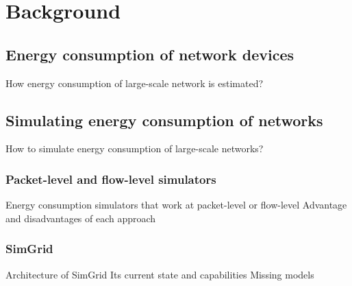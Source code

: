 \chapter{Background}
\label{chapter:background} 

\section{Energy consumption of network devices}
How energy consumption of large-scale network is estimated?
\section{Simulating energy consumption of networks}
How to simulate energy consumption of large-scale networks?
\subsection{Packet-level and flow-level simulators}
Energy consumption simulators that work at packet-level or flow-level
Advantage and disadvantages of each approach
\subsection{SimGrid}
Architecture of SimGrid
Its current state and capabilities
Missing models 
